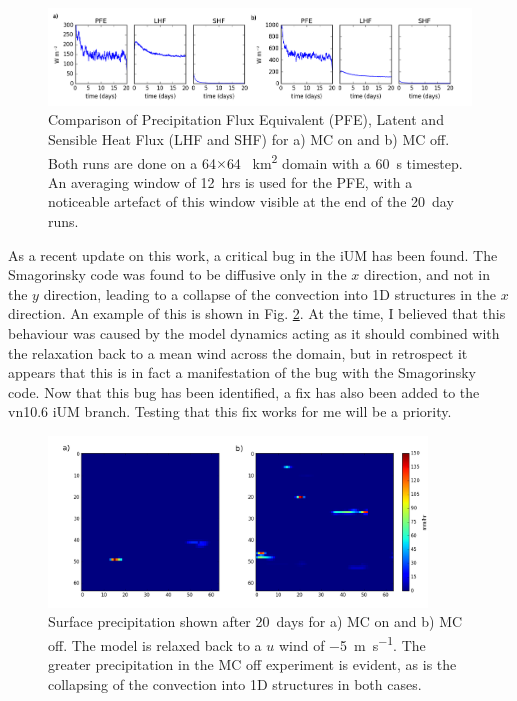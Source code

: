 \documentclass[11pt,a4paper]{article}
\begin{document}
\begin{figure}[htp!]
    \centering
    \includegraphics[width=450px]{figures/surf_ts_plots_MC_on_off}
    \caption{Comparison of Precipitation Flux Equivalent (PFE), Latent and Sensible Heat Flux (LHF and SHF) for a) MC on and b) MC off. Both runs are done on a 64$\times$64 \SI{}{km^2} domain with a \SI{60}{s} timestep. An averaging window of \SI{12}{hrs} is used for the PFE, with a noticeable artefact of this window visible at the end of the \SI{20}{day} runs.}
    \label{fig:MC_on_off}
\end{figure}

As a recent update on this work, a critical bug in the iUM has been found. The Smagorinsky code was found to be diffusive only in the $x$ direction, and not in the $y$ direction, leading to a collapse of the convection into 1D structures in the $x$ direction. An example of this is shown in Fig. \ref{fig:precip_MC_on_off}. At the time, I believed that this behaviour was caused by the model dynamics acting as it should combined with the relaxation back to a mean wind across the domain, but in retrospect it appears that this is in fact a manifestation of the bug with the Smagorinsky code. Now that this bug has been identified, a fix has also been added to the vn10.6 iUM branch. Testing that this fix works for me will be a priority.

\begin{figure}[htp!]
    \centering
    \includegraphics[width=380px]{figures/surf_precip_MC_on_off}
    \caption{Surface precipitation shown after \SI{20}{days} for a) MC on and b) MC off. The model is relaxed back to a $u$ wind of \SI{-5}{m.s^{-1}}. The greater precipitation in the MC off experiment is evident, as is the collapsing of the convection into 1D structures in both cases. }
    \label{fig:precip_MC_on_off}
\end{figure}
\end{document}
